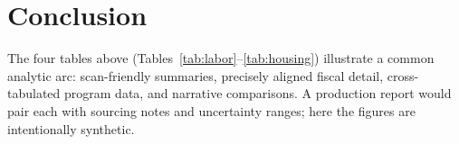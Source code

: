 \documentclass[11pt]{article}
\begin{document}
\section{Conclusion}

The four tables above (Tables~\ref{tab:labor}--\ref{tab:housing})
illustrate a common analytic arc: scan-friendly summaries, precisely
aligned fiscal detail, cross-tabulated program data, and narrative
comparisons. A production report would pair each with sourcing notes and
uncertainty ranges; here the figures are intentionally synthetic.
\end{document}
